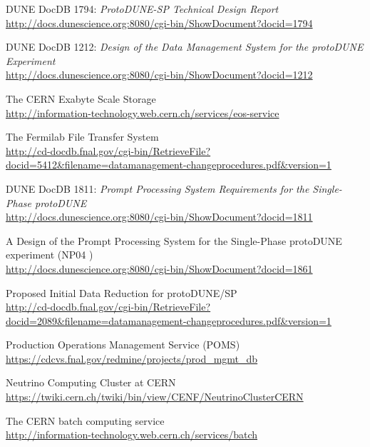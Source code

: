 \documentclass[pdftex,12pt,letter]{article}
\begin{document}
\clearpage
\begin{thebibliography}{1}

{DUNE DocDB 1794: \textit{ProtoDUNE-SP Technical Design Report }}\\
\url{http://docs.dunescience.org:8080/cgi-bin/ShowDocument?docid=1794}



{DUNE DocDB 1212: \textit{Design of the Data Management System for the protoDUNE Experiment}}\\
\url{http://docs.dunescience.org:8080/cgi-bin/ShowDocument?docid=1212}

{The CERN Exabyte Scale Storage}\\
\url{http://information-technology.web.cern.ch/services/eos-service}


{The Fermilab File Transfer System}\\
\url{http://cd-docdb.fnal.gov/cgi-bin/RetrieveFile?docid=5412&filename=datamanagement-changeprocedures.pdf&version=1}


{DUNE DocDB 1811: \textit{Prompt Processing System Requirements for the Single-Phase protoDUNE}}\\
\url{http://docs.dunescience.org:8080/cgi-bin/ShowDocument?docid=1811}

{A Design of the Prompt Processing System for the Single-Phase protoDUNE experiment (NP04 )}\\
\url{http://docs.dunescience.org:8080/cgi-bin/ShowDocument?docid=1861}

{Proposed Initial Data Reduction for protoDUNE/SP}\\
\url{http://cd-docdb.fnal.gov/cgi-bin/RetrieveFile?docid=2089&filename=datamanagement-changeprocedures.pdf&version=1}


{Production Operations Management Service (POMS)}\\
\url{https://cdcvs.fnal.gov/redmine/projects/prod_mgmt_db}





{Neutrino Computing Cluster at CERN}\\
\url{https://twiki.cern.ch/twiki/bin/view/CENF/NeutrinoClusterCERN}

{The CERN batch computing service}\\
\url{http://information-technology.web.cern.ch/services/batch}




\end{thebibliography}
\end{document}
